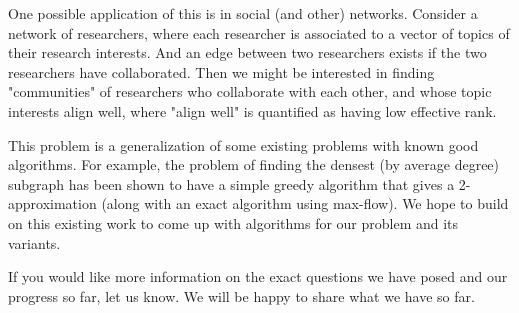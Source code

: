 \documentclass{article}
\begin{document}
One possible application of this is in social (and other) networks. Consider a network of researchers, where each researcher is associated to a vector of topics of their research interests. And an edge between two researchers exists if the two researchers have collaborated. Then we might be interested in finding "communities" of researchers who collaborate with each other, and whose topic interests align well, where "align well" is quantified as having low effective rank. 

This problem is a generalization of some existing problems with known good algorithms. For example, the problem of finding the densest (by average degree) subgraph has been shown to have a simple greedy algorithm that gives a 2-approximation (along with an exact algorithm using max-flow). We hope to build on this existing work to come up with algorithms for our problem and its variants.

If you would like more information on the exact questions we have posed and our progress so far, let us know. We will be happy to share what we have so far.
\end{document}
